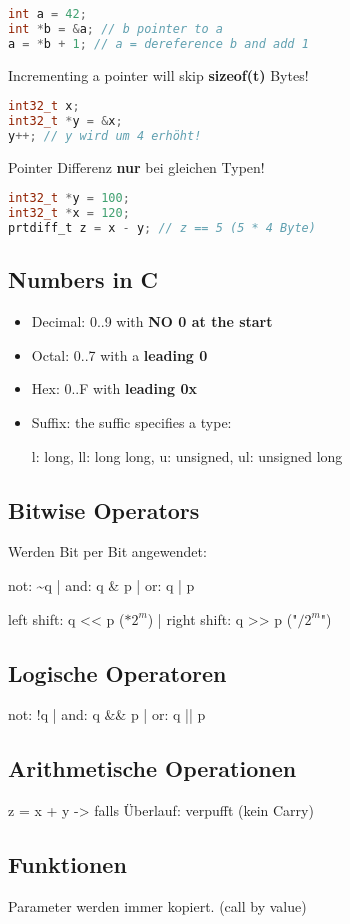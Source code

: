 \begin{multicols*}{4}
\begin{lstlisting}[language=c]
int a = 42;
int *b = &a; // b pointer to a
a = *b + 1; // a = dereference b and add 1
\end{lstlisting}
Incrementing a pointer will skip \textbf{sizeof(t)} Bytes!
\begin{lstlisting}[language=c]
int32_t x;
int32_t *y = &x;
y++; // y wird um 4 erhöht!
\end{lstlisting}
\vspace{2pt}
Pointer Differenz \textbf{nur} bei gleichen Typen!
\begin{lstlisting}[language=c]
int32_t *y = 100;
int32_t *x = 120;
prtdiff_t z = x - y; // z == 5 (5 * 4 Byte)
\end{lstlisting}

\subsection{Numbers in C}
\begin{itemize}
    \item Decimal: 0..9 with \textbf{NO 0 at the start}
    \item Octal: 0..7 with a \textbf{leading 0}
    \item Hex: 0..F with \textbf{leading 0x}
    \item Suffix: the suffic specifies a type:

    l: long, ll: long long, u: unsigned, ul: unsigned long
\end{itemize}

\subsection{Bitwise Operators}
Werden Bit per Bit angewendet:

not: \~{}q | and: q \& p | or: q | p

left shift: q << p (\(* 2^m\)) | right shift: q >> p ("\(/ 2^m\)")
\subsection{Logische Operatoren}
not: !q | and: q \&\& p | or: q || p

\subsection{Arithmetische Operationen}
z = x + y -> falls Überlauf: verpufft (kein Carry)

\subsection{Funktionen}
Parameter werden immer kopiert. (call by value)\vspace{2pt}


\end{multicols*}
